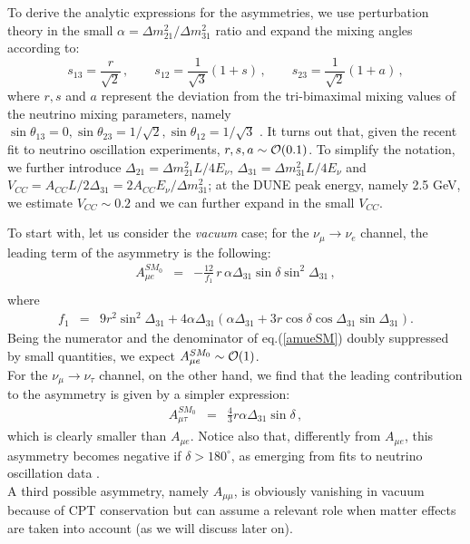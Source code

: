 \documentclass[12pt]{article}
\begin{document}
To derive the analytic expressions for the asymmetries, 
we use perturbation theory in the small $\alpha=\Delta m^2_{21}/\Delta m^2_{31}$ ratio \cite{Kopp:2007ne} and expand the mixing angles according to:
\begin{equation}
\label{expansion}
s_{13} = \frac{r}{\sqrt{2}}\,, \qquad s_{12} = \frac{1}{\sqrt{3}}(1+s)\,,\qquad s_{23} =  \frac{1}{\sqrt{2}}(1+a)\,,
\end{equation}
where $r, s$ and $a$ represent the deviation from the tri-bimaximal mixing values of the neutrino mixing parameters, namely $\sin \theta_{13}=0, \sin \theta_{23} = 1/\sqrt{2}, \sin \theta_{12} = 1/\sqrt{3}$ \cite{King:2007pr,Pakvasa:2007zj}. It turns out that, given the recent fit to neutrino oscillation experiments, $r,s,a \sim {\cal O}(0.1)$. To simplify the notation, we further introduce $\Delta_{21} = \Delta m_{21}^2 L/ 4E_\nu$, $\Delta_{31} = \Delta m_{31}^2 L/ 4E_\nu$ and $V_{CC} = A_{CC} L/ 2 \Delta_{31} = 2 A_{CC} E_\nu / \Delta m^2_{31}$; at the DUNE peak energy, namely 2.5 GeV,  we estimate $V_{CC} \sim 0.2$ and we can further expand in the small $V_{CC}$. 

To start with, let us consider the {\it vacuum} case; for the $\nu_\mu \to \nu_e$ channel, the leading term of the asymmetry is the following:
\begin{eqnarray} 
\label{amueSM}
 A_{\mu e}^{SM_0} &=& -\frac{12}{f_1}\, r\, \alpha \Delta_{31}\sin \delta \sin^2 \Delta_{31} \,, \\ \nonumber 
 \end{eqnarray}
 where
 \begin{eqnarray}
 f_1 &=& 9 r^2\sin^2 \Delta_{31}
 +4 \alpha \Delta_{31}\left(\alpha \Delta_{31} + 3 r \cos \delta \cos \Delta_{31}\sin \Delta_{31}\right).
\end{eqnarray}
Being the numerator and the denominator of eq.(\ref{amueSM}) doubly suppressed by small quantities, we expect  $A_{\mu e}^{SM_0} \sim {\cal O}(1)$.\\
For the $\nu_\mu\to\nu_\tau$ channel, on the other hand, we find that the leading contribution to the asymmetry is given by a simpler expression:
\begin{eqnarray}\label{amutauSM}
 A_{\mu\tau}^{SM_0} &=& \frac{4}{3}r \alpha \Delta_{31}\sin\delta\,,
\end{eqnarray}
which is clearly smaller than $A_{\mu e}$.
Notice also that, differently from  $A_{\mu e}$, this asymmetry becomes negative if $\delta>180^\circ$, as emerging from fits to neutrino oscillation data \cite{Esteban:2020cvm,deSalas:2020pgw}.
\\
A third possible asymmetry, namely $A_{\mu\mu}$, is obviously vanishing in vacuum because of CPT conservation but can assume a relevant role when matter effects are taken into account (as we will discuss later on). 
\end{document}
